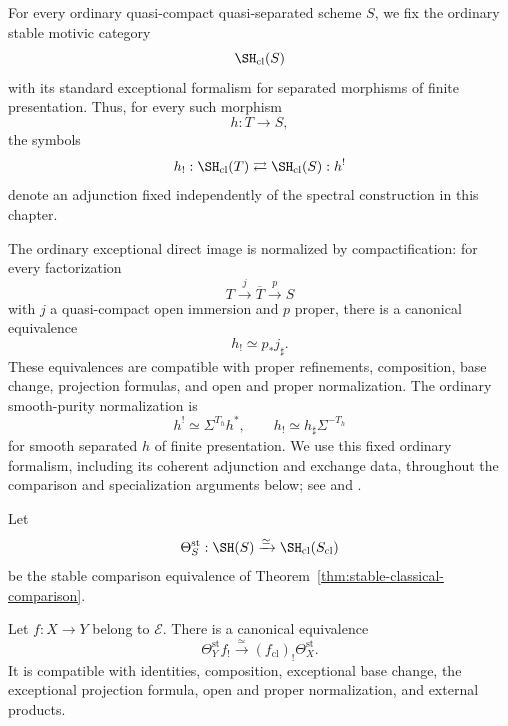 \begin{convention}
\label{conv:ordinary-exceptional-operations}
For every ordinary quasi-compact quasi-separated scheme \(S\), we fix the
ordinary stable motivic category
\[
    \SH_{\mathrm{cl}}(S)
\]
with its standard exceptional formalism for separated morphisms of finite
presentation.  Thus, for every such morphism
\[
    h:T\longrightarrow S,
\]
the symbols
\[
    h_!:
    \SH_{\mathrm{cl}}(T)
    \rightleftarrows
    \SH_{\mathrm{cl}}(S):h^!
\]
denote an adjunction fixed independently of the spectral construction in
this chapter.

The ordinary exceptional direct image is normalized by compactification:
for every factorization
\[
    T\xrightarrow{j}\overline T\xrightarrow{p}S
\]
with \(j\) a quasi-compact open immersion and \(p\) proper, there is a
canonical equivalence
\[
    h_!
    \simeq
    p_*j_\sharp.
\]
These equivalences are compatible with proper refinements, composition,
base change, projection formulas, and open and proper normalization.  The
ordinary smooth-purity normalization is
\[
    h^!
    \simeq
    \Sigma^{T_h}h^*,
    \qquad
    h_!
    \simeq
    h_\sharp\Sigma^{-T_h}
\]
for smooth separated \(h\) of finite presentation.  We use this fixed
ordinary formalism, including its coherent adjunction and exchange data,
throughout the comparison and specialization arguments below; see
\cite{HoyoisSixOperations} and
\cite{DegliseJinKhanFundamentalClasses}.
\end{convention}

Let
\[
    \Theta_S^{\mathrm{st}}:
    \SH(S)
    \xrightarrow{\simeq}
    \SH_{\mathrm{cl}}(S_{\mathrm{cl}})
\]
be the stable comparison equivalence of
Theorem~\ref{thm:stable-classical-comparison}.

\begin{theorem}
\label{thm:comparison-exceptional-direct-image}
Let \(f:X\to Y\) belong to \(\mathcal E\).  There is a canonical
equivalence
\[
    \Theta_Y^{\mathrm{st}}f_!
    \xrightarrow{\simeq}
    (f_{\mathrm{cl}})_!
    \Theta_X^{\mathrm{st}}.
\]
It is compatible with identities, composition, exceptional base change,
the exceptional projection formula, open and proper normalization, and
external products.
\end{theorem}

